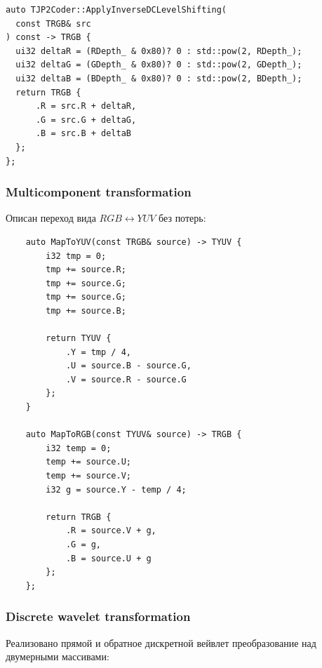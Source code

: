 \documentclass[a4paper]{article}
\newenvironment{code}{\captionsetup{type=listing}}{}
\begin{document}
  \begin{code}
    \begin{verbatim}
auto TJP2Coder::ApplyInverseDCLevelShifting(
  const TRGB& src
) const -> TRGB {
  ui32 deltaR = (RDepth_ & 0x80)? 0 : std::pow(2, RDepth_);
  ui32 deltaG = (GDepth_ & 0x80)? 0 : std::pow(2, GDepth_);
  ui32 deltaB = (BDepth_ & 0x80)? 0 : std::pow(2, BDepth_);
  return TRGB {
      .R = src.R + deltaR,
      .G = src.G + deltaG,
      .B = src.B + deltaB
  };
};
    \end{verbatim}
  \end{code}


  \subsubsection{Multicomponent transformation}

  Описан переход вида $RGB \leftrightarrow YUV$ без потерь:\\

  \begin{code}
    \begin{verbatim}
    auto MapToYUV(const TRGB& source) -> TYUV {
        i32 tmp = 0;
        tmp += source.R;
        tmp += source.G;
        tmp += source.G;
        tmp += source.B;
    
        return TYUV {
            .Y = tmp / 4,
            .U = source.B - source.G,
            .V = source.R - source.G
        };
    }
    
    auto MapToRGB(const TYUV& source) -> TRGB {
        i32 temp = 0;
        temp += source.U;
        temp += source.V;
        i32 g = source.Y - temp / 4;
    
        return TRGB {
            .R = source.V + g,
            .G = g,
            .B = source.U + g
        };
    };
    \end{verbatim}
  \end{code}

  \subsubsection{Discrete wavelet transformation}

  Реализовано прямой и обратное дискретной вейвлет преобразование
  над двумерными массивами:
\end{document}
